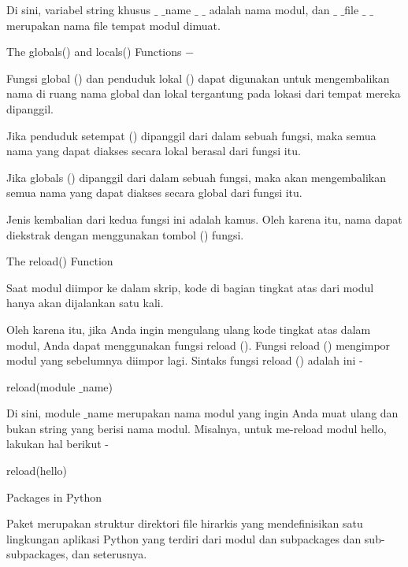 \noindent 
Di sini, variabel string khusus  $  \_  $ $  \_  $name $  \_  $ $  \_  $ adalah nama modul, dan  $  \_  $ $  \_  $file $  \_  $ $  \_  $ merupakan nama file tempat modul dimuat. \par
\vspace{12pt}
\noindent 
The $  $globals() $  $and $  $locals() $  $Functions  $ - $ \par
\noindent 
Fungsi global () dan penduduk lokal () dapat digunakan untuk mengembalikan nama di ruang nama global dan lokal tergantung pada lokasi dari tempat mereka dipanggil. \par
\noindent 
Jika penduduk setempat () dipanggil dari dalam sebuah fungsi, maka semua nama yang dapat diakses secara lokal berasal dari fungsi itu. \par
\noindent 
Jika globals () dipanggil dari dalam sebuah fungsi, maka akan mengembalikan semua nama yang dapat diakses secara global dari fungsi itu. \par
\noindent 
Jenis kembalian dari kedua fungsi ini adalah kamus. Oleh karena itu, nama dapat diekstrak dengan menggunakan tombol () fungsi. \par
\vspace{12pt}
\noindent 
The $  $reload() $  $Function \par
\noindent 
Saat modul diimpor ke dalam skrip, kode di bagian tingkat atas dari modul hanya akan dijalankan satu kali. \par
\noindent 
Oleh karena itu, jika Anda ingin mengulang ulang kode tingkat atas dalam modul, Anda dapat menggunakan fungsi reload (). Fungsi reload () mengimpor modul yang sebelumnya diimpor lagi. Sintaks fungsi reload () adalah ini - \par
\noindent 
 \hspace*{0.5in} reload(module $  \_  $name) \par
\noindent 
Di sini, module $  \_  $name merupakan nama modul yang ingin Anda muat ulang dan bukan string yang berisi nama modul. Misalnya, untuk me-reload modul hello, lakukan hal berikut - \par
\noindent 
 \hspace*{0.5in} reload(hello) \par
\vspace{12pt}
\noindent 
Packages in Python \par
\noindent 
Paket merupakan struktur direktori file hirarkis yang mendefinisikan satu lingkungan aplikasi Python yang terdiri dari modul dan subpackages dan sub-subpackages, dan seterusnya. \par
